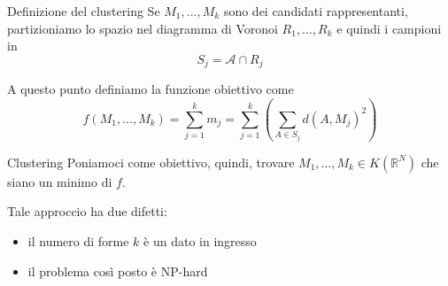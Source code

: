 \documentclass{beamer}
\theoremstyle{plain}
\theoremstyle{definition}
\theoremstyle{remark}
\newcommand{\pa}[1]{\left(#1\right)}
\begin{document}
\begin{frame}{Definizione del clustering}
  Se $M_1,...,M_k$ sono dei candidati rappresentanti, partizioniamo lo
  spazio nel diagramma di Voronoi $R_1,...,R_k$ e quindi i campioni in
  \[ S_j = \mathcal{A} \cap R_j \]
  
  \vfill

  A questo punto definiamo la funzione obiettivo come
  \[ f(M_1,...,M_k) = \sum _{j = 1} ^k m_j = \sum _{j = 1} ^k \pa{ \sum
    _{A \in S_j} d(A,M_j)^2 } \]
\end{frame}

\begin{frame}{Clustering}
  Poniamoci come obiettivo, quindi, trovare $M_1,...,M_k \in
  K(\mathbb{R}^N)$ che siano un minimo di $f$.
  
  \vfill

  Tale approccio ha due difetti:
  \begin{itemize}
  \item il numero di forme $k$ è un dato in ingresso
  \item il problema così posto è NP-hard
  \end{itemize}
\end{frame}
\end{document}
